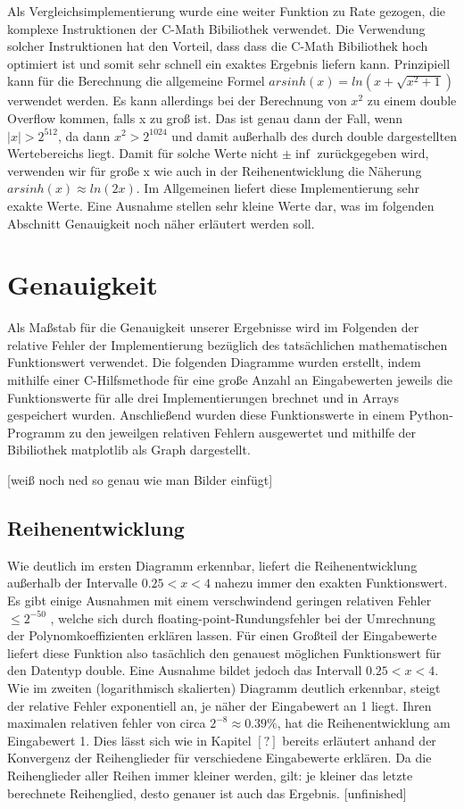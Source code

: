 \documentclass[course=erap] {aspdoc}
\begin{document}
    Als Vergleichsimplementierung wurde eine weiter Funktion zu Rate gezogen, die komplexe Instruktionen der C-Math Bibiliothek verwendet. Die Verwendung solcher Instruktionen hat den Vorteil, dass dass die C-Math Bibiliothek hoch optimiert ist und somit sehr schnell ein exaktes Ergebnis liefern kann. Prinzipiell kann für die Berechnung die allgemeine Formel $ arsinh(x) = ln \left(x + \sqrt{x^2 + 1} \right)$ verwendet werden. Es kann allerdings bei der Berechnung von $x^2$ zu einem double Overflow kommen, falls x zu groß ist. Das ist genau dann der Fall, wenn $|x| > 2^{512}$, da dann $x^2 > 2^{1024}$ und damit außerhalb des durch double dargestellten Wertebereichs liegt. Damit für solche Werte nicht $\pm \inf$ zurückgegeben wird, verwenden wir für große x wie auch in der Reihenentwicklung die Näherung $arsinh(x)\approx ln(2x)$. Im Allgemeinen liefert diese Implementierung sehr exakte Werte. Eine Ausnahme stellen sehr kleine Werte dar, was im folgenden Abschnitt Genauigkeit noch näher erläutert werden soll.

    \section{Genauigkeit}
    Als Maßstab für die Genauigkeit unserer Ergebnisse wird im Folgenden der relative Fehler der Implementierung bezüglich des tatsächlichen mathematischen Funktionswert verwendet. Die folgenden Diagramme wurden erstellt, indem mithilfe einer C-Hilfsmethode für eine große Anzahl an Eingabewerten jeweils die Funktionswerte für alle drei Implementierungen brechnet und in Arrays gespeichert wurden. Anschließend wurden diese Funktionswerte in einem Python-Programm zu den jeweilgen relativen Fehlern ausgewertet und mithilfe der Bibiliothek matplotlib als Graph dargestellt.

    [weiß noch ned so genau wie man Bilder einfügt]
    
    \subsection{Reihenentwicklung}
    Wie deutlich im ersten Diagramm erkennbar, liefert die Reihenentwicklung außerhalb der Intervalle $0.25<x<4$ nahezu immer den exakten Funktionswert. Es gibt einige Ausnahmen mit einem verschwindend geringen relativen Fehler $\leq2^{-50}$ , welche sich durch floating-point-Rundungsfehler bei der Umrechnung der Polynomkoeffizienten erklären lassen.
    Für einen Großteil der Eingabewerte liefert diese Funktion also tasächlich den genauest möglichen Funktionswert für den Datentyp double. Eine Ausnahme bildet jedoch das Intervall $0.25<x<4$. Wie im zweiten (logarithmisch skalierten) Diagramm deutlich erkennbar, steigt der relative Fehler exponentiell an, je näher der Eingabewert an 1 liegt. Ihren maximalen relativen fehler von circa $2^{-8} \approx 0.39\%$, hat die Reihenentwicklung am Eingabewert 1. Dies lässt sich wie in Kapitel $[?]$ bereits erläutert anhand der Konvergenz der Reihenglieder für verschiedene Eingabewerte erklären. Da die Reihenglieder aller Reihen immer kleiner werden, gilt: je kleiner das letzte berechnete Reihenglied, desto genauer ist auch das Ergebnis. [unfinished]
    
\end{document}
